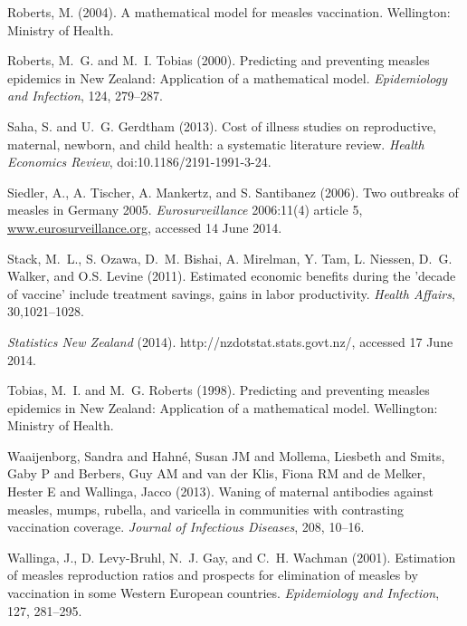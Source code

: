 \documentclass{article}
\begin{document}
\begin{thebibliography}{}
Roberts, M. (2004).
\newblock A mathematical model for measles vaccination.
\newblock Wellington: Ministry of Health.

Roberts, M.~G. and M.~I. Tobias (2000).
\newblock Predicting and preventing measles epidemics in New Zealand: Application of a mathematical model. 
\newblock \emph{Epidemiology and Infection}, 124, 279--287.

Saha, S. and U.~G. Gerdtham (2013).
\newblock Cost of illness studies on reproductive, maternal, newborn, and child health: a systematic literature review.
\newblock \emph{Health Economics Review}, doi:10.1186/2191-1991-3-24.

Siedler, A., A. Tischer, A. Mankertz, and S. Santibanez (2006).
\newblock Two outbreaks of measles in Germany 2005.
\newblock \emph{Eurosurveillance} 2006:11(4) article 5, \href{http://www.eurosurveillance.org/ViewArticle.aspx?ArticleId=615}{www.eurosurveillance.org}, accessed 14 June 2014.

Stack, M.~L., S. Ozawa, D.~M. Bishai, A. Mirelman, Y. Tam, L. Niessen, D.~G. Walker, and O.S. Levine (2011).
\newblock Estimated economic benefits during the 'decade of vaccine' include treatment savings, gains in labor productivity.
\newblock \emph{Health Affairs}, 30,1021--1028.

\newblock \emph{Statistics New Zealand} (2014).
http://nzdotstat.stats.govt.nz/, accessed 17 June 2014.

Tobias, M.~I. and M.~G. Roberts (1998).
\newblock Predicting and preventing measles epidemics in New Zealand: Application of a mathematical model.
\newblock Wellington: Ministry of Health.

Waaijenborg, Sandra and Hahn{\'e}, Susan JM and Mollema, Liesbeth and Smits, Gaby P and Berbers, Guy AM and van der Klis, Fiona RM and de Melker, Hester E and Wallinga, Jacco (2013).
\newblock Waning of maternal antibodies against measles, mumps, rubella, and varicella in communities with contrasting vaccination coverage.
\newblock \emph{Journal of Infectious Diseases}, 208, 10--16.

Wallinga, J., D. Levy-Bruhl, N.~J. Gay, and C.~H. Wachman (2001).
\newblock Estimation of measles reproduction ratios and prospects for elimination of measles by vaccination in some Western European countries.
\newblock \emph{Epidemiology and Infection}, 127, 281--295.


\end{thebibliography}
\end{document}
